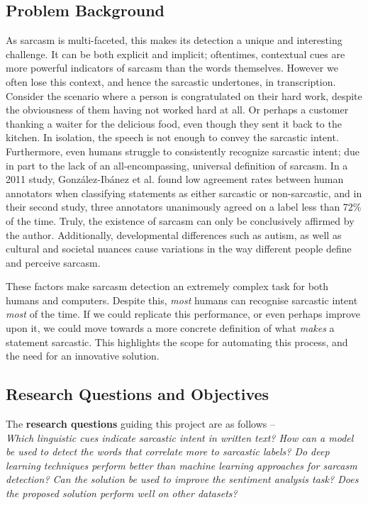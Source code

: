 \documentclass[12pt,a4paper]{article}
\begin{document}
\subsection{Problem Background}
\noindent As sarcasm is multi-faceted, this makes its detection a unique and interesting challenge. It can be both explicit and implicit; oftentimes, contextual cues are more powerful indicators of sarcasm than the words themselves. However we often lose this context, and hence the sarcastic undertones, in transcription. Consider the scenario where a person is congratulated on their hard work, despite the obviousness of them having not worked hard at all. Or perhaps a customer thanking a waiter for the delicious food, even though they sent it back to the kitchen. In isolation, the speech is not enough to convey the sarcastic intent. Furthermore, even humans struggle to consistently recognize sarcastic intent; due in part to the lack of an all-encompassing, universal definition of sarcasm. In a 2011 study, Gonz{\'a}lez-Ib{\'a}nez et al. \cite{gonzalez2011identifying} found low agreement rates between human annotators when classifying statements as either sarcastic or non-sarcastic, and in their second study, three annotators unanimously agreed on a label less than 72\% of the time. Truly, the existence of sarcasm can only be conclusively affirmed by the author. Additionally, developmental differences such as autism, as well as cultural and societal nuances cause variations in the way different people define and perceive sarcasm.

These factors make sarcasm detection an extremely complex task for both humans and computers. Despite this, \textit{most} humans can recognise sarcastic intent \textit{most} of the time. If we could replicate this performance, or even perhaps improve upon it, we could move towards a more concrete definition of what \textit{makes} a statement sarcastic. This highlights the scope for automating this process, and the need for an innovative solution.

\subsection{Research Questions and Objectives}
\noindent The \textbf{research questions} guiding this project are as follows --
\\ \indent \textit{Which linguistic cues indicate sarcastic intent in written text? How can a model be used to detect the words that correlate more to sarcastic labels? Do deep learning techniques perform better than machine learning approaches for sarcasm detection? Can the solution be used to improve the sentiment analysis task? Does the proposed solution perform well on other datasets?}\\
\end{document}

